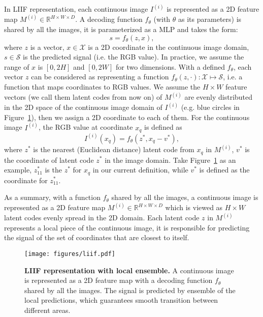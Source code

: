 \documentclass[final]{cvpr}
\begin{document}
In LIIF representation, each continuous image $I^{(i)}$ is represented as a 2D feature map $M^{(i)} \in \mathbb{R}^{H\times W\times D}$. A decoding function $f_\theta$ (with $\theta$ as its parameters) is shared by all the images, it is parameterized as a MLP and takes the form:
\begin{equation}
    s = f_\theta(z, x),
    \label{eq:liif-f}
\end{equation}
where $z$ is a vector, $x\in \mathcal{X}$ is a 2D coordinate in the  continuous image domain, $s\in \mathcal{S}$ is the predicted signal (i.e. the RGB value). In practice, we assume the range of $x$ is $[0, 2H]$ and $[0, 2W]$ for two dimensions. With a defined $f_\theta$, each vector $z$ can be considered as representing a function $f_\theta(z,\cdot): \mathcal{X} \mapsto \mathcal{S}$, i.e. a function that maps coordinates to RGB values. We assume the $H\times W$ feature vectors (we call them latent codes from now on) of $M^{(i)}$ are evenly distributed in the 2D space of the continuous image domain of $I^{(i)}$ (e.g. blue circles in Figure~\ref{fig:liif}), then we assign a 2D coordinate to each of them. For the continuous image $I^{(i)}$, the RGB value at coordinate $x_q$ is defined as
\begin{equation}
    I^{(i)}({x_q}) = f_\theta(z^*, x_q - v^*),
    \label{eq:liif-local}
\end{equation}
where $z^*$ is the nearest (Euclidean distance) latent code from $x_q$ in $M^{(i)}$,  $v^*$ is the coordinate of latent code $z^*$ in the image domain. Take Figure~\ref{fig:liif} as an example, $z^*_{11}$ is the $z^*$ for $x_q$ in our current definition, while $v^*$ is defined as the coordinate for $z^*_{11}$.

As a summary, with a function $f_\theta$ shared by all the images, a continuous image is represented as a 2D feature map $M^{(i)} \in \mathbb{R}^{H\times W\times D}$ which is viewed as $H\times W$ latent codes evenly spread in the 2D domain. Each latent code $z$ in $M^{(i)}$ represents a local piece of the continuous image, it is responsible for predicting the signal of the set of coordinates that are closest to itself.

\begin{figure}
    \centering
    \texttt{[image: figures/liif.pdf]}
    \caption{\textbf{LIIF representation with local ensemble.} A continuous image is represented as a 2D feature map with a decoding function $f_{\theta}$ shared by all the images. The signal is predicted by ensemble of the local predictions, which guarantees smooth transition between different areas.}
    \label{fig:liif}
\end{figure}
\end{document}

